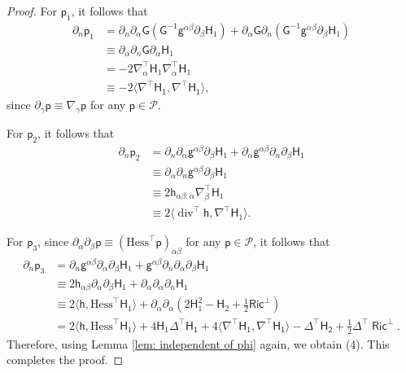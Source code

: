 \documentclass[11pt]{amsart}
\newcommand{\dvg}{\operatorname{div}}
\newcommand{\Ric}{\operatorname{Ric}}
\theoremstyle{definition}
\numberwithin{equation}{section}
\begin{document}
\begin{proof}
    For $\mathsf p_1$, it follows that
    \begin{align*}
        \partial_n\mathsf p_1 
        & = \partial_n\partial_\alpha\mathsf G(\mathsf G^{-1}\mathsf g^{\alpha\beta}\partial_\beta\mathsf H_1) + \partial_\alpha\mathsf G\partial_n(\mathsf G^{-1}\mathsf g^{\alpha\beta}\partial_\beta\mathsf H_1)\\
        & \equiv \partial_\alpha\partial_n\mathsf G\partial_\alpha\mathsf H_1\\
        & = -2\nabla^\top_\alpha\mathsf H_1\nabla^\top_\alpha\mathsf H_1\\
        & \equiv -2\langle\mathsf{\nabla^\top H_1},\mathsf{\nabla^\top H_1}\rangle,
    \end{align*}
    since $\partial_\gamma\mathsf p \equiv \nabla_{\gamma}\mathsf p$ for any $\mathsf p\in\mathcal P$.

    For $\mathsf p_2$, it follows that
    \begin{align*}
        \partial_n\mathsf p_2 
        & = \partial_n\partial_\alpha\mathsf g^{\alpha\beta}\partial_\beta\mathsf H_1 + \partial_\alpha\mathsf g^{\alpha\beta}\partial_n\partial_\beta\mathsf H_1\\
        & \equiv \partial_\alpha\partial_n\mathsf g^{\alpha\beta}\partial_\beta\mathsf H_1\\
        & \equiv 2\mathsf h_{\alpha\beta:\alpha}\nabla^\top_\beta\mathsf H_1\\
        & \equiv 2\langle\dvg^\top\mathsf h, \nabla^\top\mathsf H_1\rangle. 
    \end{align*}

    For $\mathsf p_3$, since $\partial_\alpha\partial_\beta\mathsf p\equiv (\mathrm{Hess}^\top\mathsf p)_{\alpha\beta}$ for any $\mathsf p\in\mathcal P$, it follows that
    \begin{align*}
        \partial_n\mathsf p_3 
        & = \partial_n\mathsf g^{\alpha\beta}\partial_\alpha\partial_\beta\mathsf H_1 + \mathsf g^{\alpha\beta}\partial_n\partial_\alpha\partial_\beta\mathsf H_1\\
        & \equiv 2\mathsf h_{\alpha\beta}\partial_\alpha\partial_\beta\mathsf H_1 + \partial_\alpha\partial_\alpha\partial_n\mathsf H_1\\
        & \equiv 2\langle \mathsf h, \mathrm{Hess}^\top\mathsf H_1\rangle + \partial_\alpha\partial_\alpha(2\mathsf H_1^2 - \mathsf H_2 + \frac{1}{2}\mathsf{Ric}^\bot)\\
        & = 2\langle \mathsf h, \mathrm{Hess}^\top\mathsf H_1\rangle + 4\mathsf H_1\mathsf{\Delta^\top H_1} + 4\langle\mathsf{\nabla^\top H_1},\mathsf{\nabla^\top H_1}\rangle - \mathsf{\Delta^\top H_2} + \frac{1}{2}\mathsf{\Delta^\top \Ric^\bot}.
    \end{align*}
    Therefore, using Lemma \ref{lem: independent of phi} again, we obtain (4). This completes the proof.
\end{proof}
\end{document}
